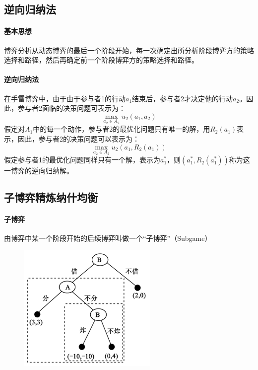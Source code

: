 \documentclass[12pt,a4paper]{article}
\begin{document}
\subsection{逆向归纳法}
\paragraph{基本思想} 博弈分析从动态博弈的最后一个阶段开始，每一次确定出所分析阶段博弈方的策略选择和路径，然后再确定前一个阶段博弈方的策略选择和路径。

\paragraph{逆向归纳法} 在手雷博弈中，由于由于参与者1的行动$a_1$结束后，参与者2才决定他的行动$a_2$。因此，参与者2面临的决策问题可表示为：
\begin{equation}
	\max_{a_2 \in A_2}u_2(a_1,a_2)
\end{equation}
假定对$A_1$中的每一个动作，参与者2的最优化问题只有唯一的解，用$R_2(a_1)$表示，因此，参与者2的决策问题可以表示为：
\begin{equation}
	\max_{a_2 \in A_2}u_2(a_1,R_2(a_1))
\end{equation}
假定参与者1的最优化问题同样只有一个解，表示为$a_1^*$，则$(a_1^*, R_2(a_1^*))$称为这一博弈的逆向归纳解。
\subsection{子博弈精炼纳什均衡}
\paragraph{子博弈} 由博弈中某一个阶段开始的后续博弈叫做一个“子博弈”（Subgame）
\begin{figure}[H]
	\centering
	\includegraphics[width=0.6\textwidth]{../images/game-theory-subgame.png}
	\caption{}
	\label{}
\end{figure}
\end{document}

